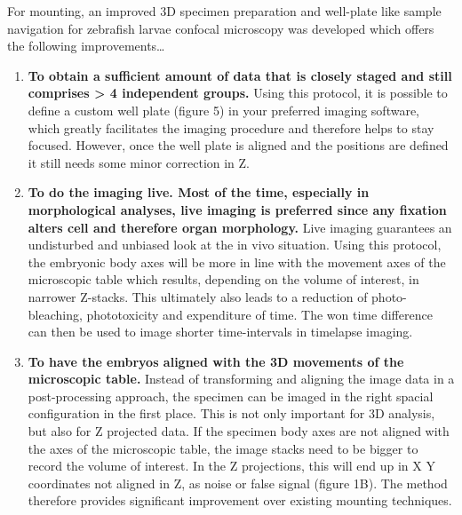 \documentclass[11pt,singlespacinge,twoside]{reedthesis} %
\begin{document}
For mounting, an improved 3D specimen preparation and well-plate like sample navigation for zebrafish larvae confocal microscopy was developed which offers the following improvements\ldots{}
\begin{enumerate}
\def\labelenumi{\arabic{enumi}.}
\item
  \textbf{To obtain a sufficient amount of data that is closely staged and still comprises \textgreater{} 4 independent groups.} Using this protocol, it is possible to define a custom well plate (figure 5) in your preferred imaging software, which greatly facilitates the imaging procedure and therefore helps to stay focused. However, once the well plate is aligned and the positions are defined it still needs some minor correction in Z.
\item
  \textbf{To do the imaging live. Most of the time, especially in morphological analyses, live imaging is preferred since any fixation alters cell and therefore organ morphology.} Live imaging guarantees an undisturbed and unbiased look at the in vivo situation. Using this protocol, the embryonic body axes will be more in line with the movement axes of the microscopic table which results, depending on the volume of interest, in narrower Z-stacks. This ultimately also leads to a reduction of photo-bleaching, phototoxicity and expenditure of time. The won time difference can then be used to image shorter time-intervals in timelapse imaging.
\item
  \textbf{To have the embryos aligned with the 3D movements of the microscopic table.} Instead of transforming and aligning the image data in a post-processing approach, the specimen can be imaged in the right spacial configuration in the first place. This is not only important for 3D analysis, but also for Z projected data. If the specimen body axes are not aligned with the axes of the microscopic table, the image stacks need to be bigger to record the volume of interest. In the Z projections, this will end up in X Y coordinates not aligned in Z, as noise or false signal (figure 1B). The method therefore provides significant improvement over existing mounting techniques.
\end{enumerate}
\end{document}
